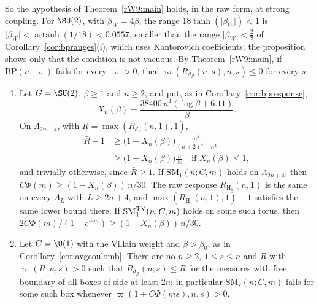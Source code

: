 So the hypothesis of Theorem~\ref{rW9:main} holds, in the raw form, at
strong coupling. For $\SU(2)$, with $\beta_W=4\beta$, the range
$18\tanh(\lvert\beta_W\rvert)<1$ is $\lvert\beta_W\rvert<\operatorname{artanh}
(1/18)<0.0557$, smaller than the range $\lvert\beta_W\rvert<\frac29$ of
Corollary~\ref{cor:bpranges}(i), which uses Kantorovich coefficients; the
proposition shows only that the condition is not vacuous. By
Theorem~\ref{rW9:main}, if $\mathrm{BP}(n,\varpi)$ fails for every
$\varpi>0$, then $\varpi(R_{d_{\mathcal G}}(n,s),n,s)\le0$ for every $s$.

\begin{proposition}\label{rW9:fails}
\begin{enumerate}[label=\textup{(\roman*)},leftmargin=*]
\item Let $G=\SU(2)$, $\beta\ge1$ and $n\ge2$, and put, as in
Corollary~\ref{cor:bpresponse},
\[
X_n(\beta)=\frac{38400\,n^4(\log\beta+6.11)}\beta .
\]
On $\Lambda_{2n+4}$, with $\bar R=\max(R_{d_{\mathcal G}}(n,1),1)$,
\[
\begin{split}
\bar R-1&\ge\bigl(1-X_n(\beta)\bigr)\frac{n^4}{(n+2)^4-n^4}\\
&\ge\bigl(1-X_n(\beta)\bigr)\frac n{30}\quad\text{if }X_n(\beta)\le1,
\end{split}
\]
and trivially otherwise, since $\bar R\ge1$. If $\mathrm{SM}_1(n;C,m)$ holds on $\Lambda_{2n+4}$, then $C\Phi(m)\ge
(1-X_n(\beta))\,n/30$. The raw response $R_{\mathrm H_1}(n,1)$ is the same
on every $\Lambda_L$ with $L\ge2n+4$, and $\max(R_{\mathrm H_1}(n,1),1)-1$
satisfies the same lower bound there. If $\mathrm{SM}^{\rm TV}_1(n;C,m)$
holds on some such torus, then $2C\Phi(m)/(1-e^{-m})\ge(1-X_n(\beta))\,
n/30$.
\item Let $G=\U(1)$ with the Villain weight and $\beta>\beta_0$, as in
Corollary~\ref{cor:avgcoulomb}. There are no $n\ge2$, $1\le s\le n$ and $R$ with
$\varpi(R,n,s)>0$ such that $R_{d_{\mathcal G}}(n,s)\le R$ for the measures
with free boundary of all boxes of side at least $2n$; in particular
$\mathrm{SM}_s(n;C,m)$ fails for some such box whenever $\varpi(1+C\Phi(ms),n,
s)>0$.
\end{enumerate}
\end{proposition}

